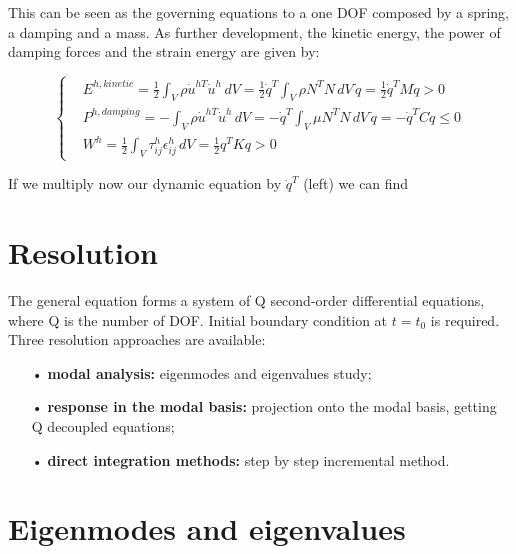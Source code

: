 	This can be seen as the governing equations to a one DOF composed by a spring, a damping and a mass. As further development, the kinetic energy, the power of damping forces and the strain energy are given by: 
	
	\begin{equation}
	\left\{	
	\begin{aligned}
	&E^{h,kinetic} = \frac{1}{2}\int _V \rho \dot{u}^{hT}\dot{u}^h\, dV = \frac{1}{2} \dot{q} ^T \int _V \rho N^{T}N \, dV \, \dot{q} = \frac{1}{2} \dot{q}^T M \dot{q} > 0\\
	&P^{h,damping} = - \int _V \rho \dot{u}^{hT}\dot{u}^h\, dV = - \dot{q} ^T \int _V \mu N^{T}N \, dV \, \dot{q} = - \dot{q}^T C \dot{q} \leq 0\\
	&W^h = \frac{1}{2}\int _V \tau _{ij}^h \epsilon _{ij}^h\, dV = \frac{1}{2} q^T K q > 0
	\end{aligned}
	\right.
	\end{equation}
	
	If we multiply now our dynamic equation by $\dot{q}^T$ (left) we can find 
	
	\begin{center}
	\end{center}
	
\section{Resolution}
	The general equation forms a system of Q second-order differential equations, where Q is the number of DOF. Initial boundary condition at $t = t_0$ is required. Three resolution approaches are available: 
	
	\begin{itemize}
	\item[•] \textbf{modal analysis:} eigenmodes and eigenvalues study;
	\item[•] \textbf{response in the modal basis:} projection onto the modal basis, getting Q decoupled equations;
	\item[•] \textbf{direct integration methods:} step by step incremental method. 
	\end{itemize}
	
\section{Eigenmodes and eigenvalues}
